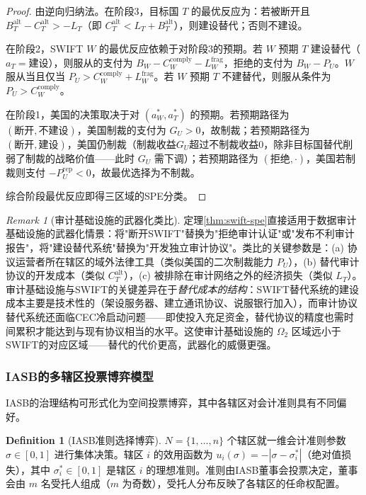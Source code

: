 \documentclass[12pt,a4paper]{ctexart}
\theoremstyle{definition}
\newtheorem{definition}{Definition}[section]
\theoremstyle{remark}
\newtheorem{remark}{Remark}[section]
\begin{document}
\begin{proof}
由逆向归纳法。在阶段3，目标国 $T$ 的最优反应为：若被断开且 $B_T^{\text{alt}} - C_T^{\text{alt}} > -L_T$（即 $C_T^{\text{alt}} < L_T + B_T^{\text{alt}}$），则建设替代；否则不建设。

在阶段2，SWIFT $W$ 的最优反应依赖于对阶段3的预期。若 $W$ 预期 $T$ 建设替代（$a_T = \text{建设}$），则服从的支付为 $B_W - C_W^{\text{comply}} - L_W^{\text{frag}}$，拒绝的支付为 $B_W - P_U$。$W$ 服从当且仅当 $P_U > C_W^{\text{comply}} + L_W^{\text{frag}}$。若 $W$ 预期 $T$ 不建替代，则服从条件为 $P_U > C_W^{\text{comply}}$。

在阶段1，美国的决策取决于对 $(a_W^*, a_T^*)$ 的预期。若预期路径为 $(\text{断开}, \text{不建设})$，美国制裁的支付为 $G_U > 0$，故制裁；若预期路径为 $(\text{断开}, \text{建设})$，美国仍制裁（制裁收益$G_U$超过不制裁收益0，除非目标国替代削弱了制裁的战略价值——此时 $G_U$ 需下调）；若预期路径为 $(\text{拒绝}, \cdot)$，美国若制裁则支付 $-P_U^{\text{rep}} < 0$，故最优选择为不制裁。

综合阶段最优反应即得三区域的SPE分类。
\end{proof}

\begin{remark}[审计基础设施的武器化类比]
定理\ref{thm:swift-spe}直接适用于数据审计基础设施的武器化情景：将"断开SWIFT"替换为"拒绝审计认证"或"发布不利审计报告"，将"建设替代系统"替换为"开发独立审计协议"。类比的关键参数是：(a) 协议运营者所在辖区的域外法律工具（类似美国的二次制裁能力 $P_U$），(b) 替代审计协议的开发成本（类似 $C_T^{\text{alt}}$），(c) 被排除在审计网络之外的经济损失（类似 $L_T$）。审计基础设施与SWIFT的关键差异在于\textit{替代成本的结构}：SWIFT替代系统的建设成本主要是技术性的（架设服务器、建立通讯协议、说服银行加入），而审计协议替代系统还面临CEC冷启动问题——即使投入充足资金，替代协议的精度也需时间累积才能达到与现有协议相当的水平。这使审计基础设施的 $\Omega_2$ 区域远小于SWIFT的对应区域——替代的代价更高，武器化的威慑更强。
\end{remark}

\subsubsection{IASB的多辖区投票博弈模型}

IASB的治理结构可形式化为空间投票博弈，其中各辖区对会计准则具有不同偏好。

\begin{definition}[IASB准则选择博弈]
$N = \{1, \ldots, n\}$ 个辖区就一维会计准则参数 $\sigma \in [0,1]$ 进行集体决策。辖区 $i$ 的效用函数为 $u_i(\sigma) = -|\sigma - \sigma_i^*|$（绝对值损失），其中 $\sigma_i^* \in [0,1]$ 是辖区 $i$ 的理想准则。准则由IASB董事会投票决定，董事会由 $m$ 名受托人组成（$m$ 为奇数），受托人分布反映了各辖区的任命权配置。
\end{definition}
\end{document}
